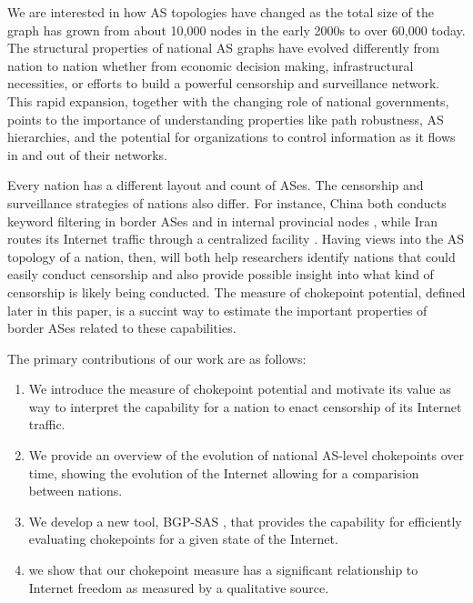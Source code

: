 \documentclass[10pt, conference, letterpaper]{IEEEtran}
\newcommand{\toolname}{BGP-SAS }
\begin{document}

We are interested in how AS topologies have changed as the total size of the graph has grown from about 10,000 nodes in the early 2000s to over 60,000 today.
The structural
properties of national AS graphs have evolved differently
from nation to nation whether from economic decision making, infrastructural necessities, or
efforts to build a powerful censorship and surveillance
network.
This rapid expansion, together with the changing role of national
governments, points to the importance of understanding properties like
path robustness, AS hierarchies, and the potential for organizations to
control information as it flows in and out of their networks.


\par Every nation has a different layout and count of ASes. The
censorship and surveillance strategies of nations also differ. For
instance, China both conducts keyword filtering in border ASes and in
internal provincial nodes \cite{chinafiltering}, while Iran routes its
Internet traffic through a centralized facility \cite{irancensor}.
Having views into the AS topology of a nation, then, will both help
researchers identify nations that could easily conduct censorship and
also provide possible insight into what kind of censorship is likely
being conducted. The measure of chokepoint potential, defined later in
this paper, is a succint way to estimate the important properties of
border ASes related to these capabilities.

\par
The primary contributions of our work are as follows: 
\begin{enumerate}
 \item We introduce the measure of chokepoint potential and 
motivate its value as way to interpret the capability for a nation to enact censorship of its Internet traffic.
 \item We provide an overview of the evolution of national AS-level chokepoints over time, showing the evolution of the Internet
allowing for a comparision between nations.
 \item We develop a new tool, \toolname, that provides the capability for
efficiently evaluating chokepoints for a given state of the Internet. 
 \item we show that our chokepoint measure
has a significant relationship to Internet freedom as measured by a qualitative source.
\end{enumerate}
\end{document}

